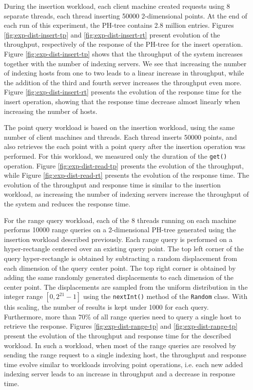 \documentclass[11pt,a4paper]{globis-book}
\begin{document}
During the insertion workload, each client machine created requests using 8 separate threads, each thread inserting 50000 2-dimensional points. At the end of each run of this experiment, the PH-tree contains 2.8 million entries. Figures \ref{fig:exp-dist-insert-tp} and \ref{fig:exp-dist-insert-rt} present evolution of the throughput, respectively of the response of the PH-tree for the insert operation. Figure \ref{fig:exp-dist-insert-tp} shows that the throughput of the system increases together with the number of indexing servers. We see that increasing the number of indexing hosts from one to two leads to a linear increase in throughput, while the addition of the third and fourth server increases the throughput even more. Figure \ref{fig:exp-dist-insert-rt} presents the evolution of the response time for the insert operation, showing that the response time decrease almost linearly when increasing the number of hosts. 

The point query workload is based on the insertion workload, using the same number of client machines and threads. Each thread inserts 50000 points, and also retrieves the each point with a point query after the insertion operation was performed. For this workload, we measured only the duration of the \texttt{get()} operation.  Figure \ref{fig:exp-dist-read-tp} presents the evolution of the throughput, while Figure \ref{fig:exp-dist-read-rt} presents the evolution of the response time. The evolution of the throughput and response time is similar to the insertion workload, as increasing the number of indexing servers increase the throughput of the system and reduces the response time. 

For the range query workload, each of the 8 threads running on each machine performs 10000 range queries on a 2-dimensional PH-tree generated using the insertion workload described previously. Each range query is performed on a hyper-rectangle centered over an existing query point. The top left corner of the query hyper-rectangle is obtained by subtracting a random displacement from each dimension of the query center point. The top right corner is obtained by adding the same randomly generated displacements to each dimension of the center point. The displacements are sampled from the uniform distribution in the integer range $[0, 2^{21} - 1]$ using the \texttt{nextInt()} method of the \texttt{Random} class. With this scaling, the number of results is kept under 1000 for each query. Furthermore, more than $70\%$ of all range queries need to query a single host to retrieve the response. Figures \ref{fig:exp-dist-range-tp} and \ref{fig:exp-dist-range-tp} present the evolution of the throughput and response time for the described workload. In such a workload, when most of the range queries are resolved by sending the range request to a single indexing host, the throughput and response time evolve similar to workloads involving point operations, i.e. each new added indexing server leads to an increase in throughput and a decrease in response time.
\end{document}

